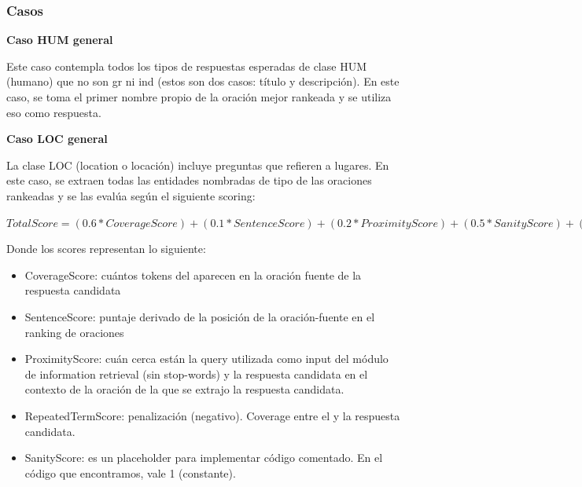 \begin{frame}
\frametitle{Casos}

\textbf{Caso HUM general} \newline

Este caso contempla todos los tipos de respuestas esperadas de clase HUM (humano) que no son gr ni ind (estos son dos casos: título y descripción). En este caso, se toma el primer nombre propio de la oración mejor rankeada y se utiliza eso como respuesta. \newline

\textbf{Caso LOC general} \newline

La clase LOC (location o locación) incluye preguntas que refieren a lugares.  En este caso, se extraen todas las entidades nombradas de tipo  de las oraciones rankeadas y se las evalúa según el siguiente scoring:

$TotalScore = (0.6 * CoverageScore) + (0.1 * SentenceScore) + (0.2 * ProximityScore)  + (0.5 * SanityScore) + (0.3 * RepeatedTermScore)$ \newline

Donde los scores representan lo siguiente:
\begin{itemize}
  \item CoverageScore: cuántos tokens del  aparecen en la oración fuente de la respuesta candidata
  \item SentenceScore: puntaje derivado de la posición de la oración-fuente en el ranking de oraciones
  \item ProximityScore: cuán cerca están la query utilizada como input del módulo de information retrieval (sin stop-words) y la respuesta candidata en el contexto de la oración de la que se extrajo la respuesta candidata.
  \item RepeatedTermScore: penalización (negativo). Coverage entre el  y la respuesta candidata.
  \item SanityScore: es un placeholder para implementar código comentado. En el código que encontramos, vale 1 (constante).
\end{itemize}

\end{frame}

